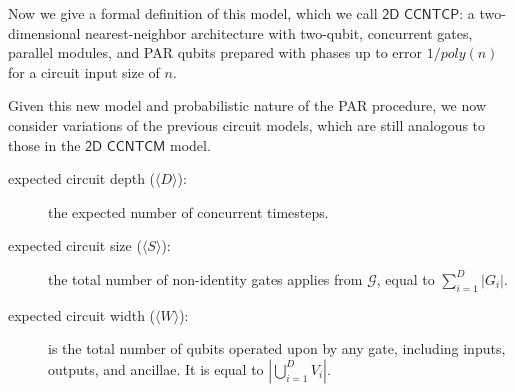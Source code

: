 Now we give a formal definition of this model, which we call
$\textsf{2D CCNTCP}$: a two-dimensional nearest-neighbor architecture
with two-qubit, concurrent gates, parallel modules, and PAR qubits
prepared with phases up to error $1/poly(n)$ for a circuit input size of $n$.



Given this new model and probabilistic nature of the PAR procedure, we now
consider variations of the previous circuit models, which are still
analogous to those in the $\textsf{2D CCNTCM}$ model.

\begin{description}
\item[expected circuit depth ($\langle D \rangle $):] the expected number of concurrent timesteps.
\item[expected circuit size ($\langle S \rangle$):] the total number of non-identity gates applies
from $\mathcal{G}$, equal to $\sum_{i=1}^D |G_i|$.
\item[expected circuit width ($\langle W \rangle$):] is the total number of qubits operated upon by
any gate, including inputs, outputs, and ancillae. It is equal to $| \bigcup_{i=1}^D V_i|$.

\end{description}

